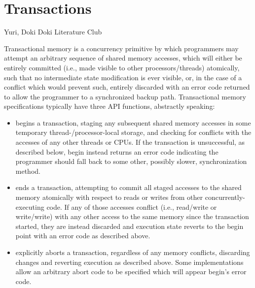 \chapter{Transactions}
\label{chap:tm}


{Yuri, Doki Doki Literature Club}

Transactional memory  is a concurrency primitive
by which programmers may attempt an arbitrary sequence of shared memory accesses,
which will either be entirely committed (i.e., made visible to other processors/threads) atomically,
such that no intermediate state modification is ever visible,
or, in the case of a conflict which would prevent such,
entirely discarded with an error code returned to allow the programmer to  a synchronized backup path.
%
Transactional memory specifications typically have three API functions, abstractly speaking:
\begin{itemize}
	\item  {\sf {}} begins a transaction,
		staging any subsequent shared memory accesses in some temporary thread-/processor-local storage,
		and checking for conflicts with the accesses of any other threads or CPUs.
		If the transaction is unsuccessful, as described below,
		{\sf begin} instead returns an error code
		indicating the programmer should fall back to some other, possibly slower, synchronization method.
	\item {\sf {}} ends a transaction,
		attempting to commit all staged accesses to the shared memory atomically with respect to
		reads or writes from other concurrently-executing code.
		If any of those accesses conflict (i.e., read/write or write/write)
		with any other access to the same memory since the transaction started,
		they are instead discarded and execution state reverts to the {\sf begin} point
		with an error code as described above.
	\item {\sf {}} explicitly aborts a transaction,
		regardless of any memory conflicts,
		discarding changes and reverting execution as described above.
		Some implementations allow an arbitrary abort code to be specified
		which will appear  {\sf begin}'s error code.
\end{itemize}

